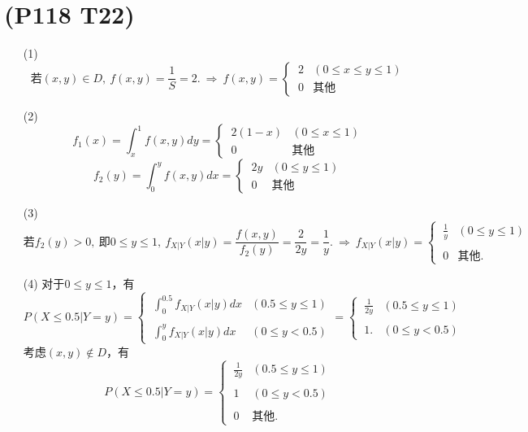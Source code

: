 \documentclass{article}
\begin{document}
\section{(P118 T22)}  %
\begin{enumerate}
    \item [(1)]
    \[
        \mbox{若}(x,y)\in D,\ f(x,y) = \frac{1}{S} = 2.
        \ \Rightarrow\ 
        f(x,y)=
        \begin{cases}
            \ 2 & (0\leq x \leq y \leq 1)\\
            \ 0 & \mbox{其他}
        \end{cases}
    \]
    \item [(2)]
    \[
        f_1 (x) 
        = \int_{x}^{1} f(x,y) dy  
        = 
        \begin{cases}
            \ 2(1-x) & (0\leq x \leq 1)\\
            \ 0 & \mbox{其他}
        \end{cases}
    \]
    \[
        f_2 (y) 
        = \int_{0}^{y} f(x,y) dx 
        = 
        \begin{cases}
            \ 2y & (0\leq y \leq 1)\\
            \ 0 & \mbox{其他}
        \end{cases}   
    \]
    \item [(3)]
    \[  
        \mbox{若} f_2 (y)>0,\ \mbox{即} 0\leq y \leq 1,\ 
        f_{X|Y}(x|y)
        = \frac{f(x,y)}{f_2(y)}    
        = \frac{2}{2y}
        = \frac{1}{y}.
        \ \Rightarrow\ 
        f_{X|Y}(x|y)
        =
        \begin{cases}
            \ \displaystyle{\frac{1}{y}} & (0\leq y \leq 1)\\ 
            \\
            \ 0 & \mbox{其他}.
        \end{cases}
    \]
    \item [(4)]对于$0\leq y \leq 1$，有
    \[
        P(X\leq 0.5 | Y = y) 
        =
        \begin{cases}
            \ \displaystyle{\int_{0}^{0.5} f_{X|Y}(x|y) dx} & (0.5 \leq y \leq 1)\\
            \\
            \ \displaystyle{\int_{0}^{y} f_{X|Y}(x|y) dx} & (0\leq y <0.5)
        \end{cases} 
        = 
        \begin{cases}
            \ \displaystyle{\frac{1}{2y}} & (0.5\leq y \leq 1)\\
            \\ 
            \ 1. & (0 \leq y <0.5)   
        \end{cases}
    \]
    考虑$(x,y)\notin D$，有
    \[
        P(X\leq 0.5 | Y = y) 
        = 
        \begin{cases}
            \ \displaystyle{\frac{1}{2y}} & (0.5\leq y \leq 1)\\
            \\ 
            \ 1 & (0 \leq y <0.5)\\
            \\
            \ 0 & \mbox{其他}.
        \end{cases}
    \]
\end{enumerate}
\end{document}
